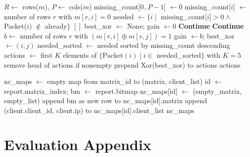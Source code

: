 \begin{algorithm}
	\caption{Greedy action selection with coding in compute\_retransmissions}
	\label{alg:compute-retransmissions}
	\begin{algorithmic}[1]
		\State $R \gets$ rows($m$), $P \gets$ cols($m$)
		\State missing\_count[$0..P-1$] $\gets 0$
		\State missing\_count[$i$] $\gets$ number of rows $r$ with $m[r,i]=0$ 
		\EndFor
		\State needed $\gets \{i \mid$ missing\_count[$i$]$>0 \land$ Packet($i$) $\notin$ already$\}$
		 \State \Return $[]$ \EndIf
		\State best\_xor $\gets$ None; gain $\gets 0$
		 \State \textbf{Continue} \EndIf
		 \State \textbf{Continue} \EndIf
		\State $b \gets$ number of rows $r$ with $(m[r,i] \oplus m[r,j])=1$
		 \State gain $\gets b$; best\_xor $\gets (i,j)$ \EndIf
		\EndFor
		\EndFor
		\State needed\_sorted $\gets$ needed sorted by missing\_count descending
		\State actions $\gets$ first $K$ elements of $\{\text{Packet}(i) \mid i \in$ needed\_sorted$\}$ with $K=5$
		\State remove head of actions if nonempty
		\State prepend Xor(best\_xor) to actions
		\EndIf
		\State \Return actions
	\end{algorithmic}
\end{algorithm}

\begin{algorithm}
	\caption{Construction of NC matrices from client reports}
	\label{alg:generate-nc-matrices}
	\begin{algorithmic}[1]
		\State nc\_maps $\gets$ empty map from matrix\_id to (matrix, client\_list)
		\State id $\gets$ report.matrix\_index; bm $\gets$ report.bitmap
		 \State nc\_maps[id] $\gets$ (empty\_matrix, empty\_list) \EndIf
		\State append bm as new row to nc\_maps[id].matrix
		\State append (client.client\_id, client.ip) to nc\_maps[id].client\_list
		\EndFor
		\EndFor
		\State \Return nc\_maps
	\end{algorithmic}
\end{algorithm}


\section{Evaluation Appendix}
\label{appendix:evaluation appendix}

